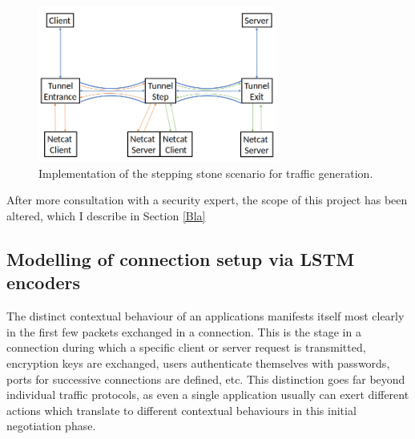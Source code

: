 \documentclass[a4paper,12pt,twoside]{article}
\begin{document}
\begin{figure}
\centering
\includegraphics[width=0.7\textwidth]{images/Step_stones.png}
\caption{Implementation of the stepping stone scenario for traffic generation.}\label{stepstone}
\end{figure}

After more consultation with a security expert, the scope of this project has been altered, which I describe in Section \ref{Bla}








\subsection{Modelling of connection setup via LSTM encoders}\label{Sec:Encoder}

The distinct contextual behaviour of an applications manifests itself most clearly in the first few packets exchanged in a connection. This is the stage in a connection during which a specific client or server request is transmitted, encryption keys are exchanged, users authenticate themselves with passwords, ports for successive connections are defined, etc. This distinction goes far beyond individual traffic protocols, as even a single application usually can exert different actions which translate to different contextual behaviours in this initial negotiation phase. 
\end{document}
